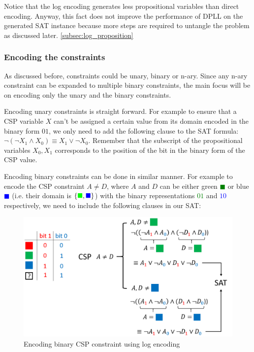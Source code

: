 Notice that the log encoding generates less propositional variables than direct encoding. Anyway, this fact does not improve the performance of DPLL on the generated SAT instance because more steps are required to untangle the problem as discussed later. \ref{subsec:log_proposition}

\subsubsection{Encoding the constraints}
As discussed before, constraints could be unary, binary or n-ary. Since any n-ary constraint can be expanded to multiple binary constraints, the main focus will be on encoding only the unary and the binary constraints.

Encoding unary constraints is straight forward. For example to ensure that a CSP variable $X$ can't be assigned a certain value from its domain encoded in the binary form $01$, we only need to add the following clause to the SAT formula: $\neg (\neg X_1 \wedge X_0) \equiv X_1 \vee \neg X_0$. Remember that the subscript of the propositional variables $X_0, X_1$ corresponds to the position of the bit in the binary form of the CSP value.

Encoding binary constraints can be done in similar manner. For example to encode the CSP constraint $A \neq D$, where $A$ and $D$ can be either green \textcolor{green}{$\blacksquare$} or blue \textcolor{blue}{$\blacksquare$} (i.e. their domain is $\{ \textcolor{green}{\blacksquare}, \textcolor{blue}{\blacksquare} \}$) with the binary representations \textcolor{green}{$01$} and \textcolor{blue}{$10$} respectively, we need to include the following clauses in our SAT:
\begin{figure}[H]
	\centering
	\includegraphics[width=0.7\linewidth]{assets/binary_constraints_log_encoding}
	\captionsetup{justification=centering,margin=2cm}
	\caption{Encoding binary CSP constraint using log encoding}
	\label{fig:binary_constraints_log_encoding}
\end{figure}

